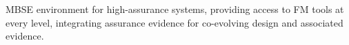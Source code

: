 
MBSE environment for high-assurance systems, providing access to FM tools at every level, integrating assurance evidence for co-evolving design and associated evidence.
